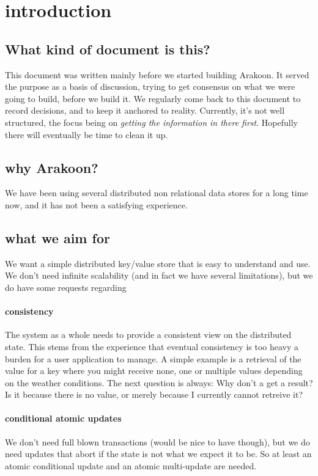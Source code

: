 \section{introduction}
\subsection{What kind of document is this?}
This document was written mainly before we started building Arakoon. 
It served the purpose as a basis of discussion, 
trying to get consensus on what we were going to build, before we build it. 
We regularly come back to this document to record decisions, and to keep it anchored to reality. Currently, it's not well structured, the focus being on \emph{getting the information in there first}. 
Hopefully there will eventually be time to clean it up.
\subsection{why Arakoon?}
We have been using several distributed non relational data stores for a long time now, and it has not been a satisfying experience.
\subsection{what we aim for}
We want a simple distributed key/value store that is easy to understand and use.
We don't need infinite scalability (and in fact we have several limitations), but we do have some requests regarding
\paragraph{consistency}
The system as a whole needs to provide a consistent view on the distributed state.
This stems from the experience that eventual consistency is too heavy a burden for a user application to manage. 
A simple example is a retrieval of the value for a key where you might receive none, one or multiple values depending on the weather conditions. The next question is always: Why don't a get a result? Is it because there is no value, or merely because I currently cannot retreive it?

\paragraph{conditional atomic updates}
We don't need full blown transactions (would be nice to have though), 
but we do need updates that abort if the state is not what we expect it to be.
So at least an atomic conditional update and an atomic multi-update are needed.
